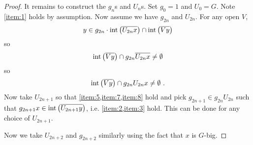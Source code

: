 \documentclass{amsart}
\begin{document}
\begin{proof}
It remains to construct the $g_n$s and $U_n$s. Set $g_{0} = 1$ and $U_0 = G$.
Note \cref{item:1} holds by assumption.
Now assume we have $g_{2n}$ and $U_{2n}$. For any open $V$, 
\begin{equation}
y\in g_{2n}\cdot \operatorname{int}\left(\overline{U_{2n}x}\right)\cap \operatorname{int}\left(\overline{Vy}\right)
\end{equation}
so
\begin{equation}
\operatorname{int}\left(\overline{Vy}\right)\cap g_{2n} \overline{U_{2n}x} \neq \emptyset
\end{equation}
so
\begin{equation}
\operatorname{int}\left(\overline{Vy}\right)\cap g_{2n} U_{2n} x \neq \emptyset \ .
\end{equation}
Now take $U_{2n+1}$ so that \cref{item:5,item:7,item:8} hold and 
pick $g_{2n+1}\in g_{2n} U_{2n}$ such that
$g_{2n+1} x\in \operatorname{int}\left(\overline{U_{2n+1} y}\right)$, i.e. \cref{item:2,item:3} hold. 
This can be done for any choice of $U_{2n+1}$. 

Now we take $U_{2n+2}$ and $g_{2n+2}$ similarly using the fact that $x$ is $G$-big.
\end{proof}
\end{document}
